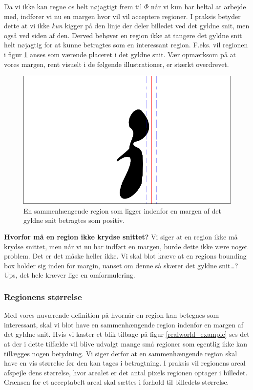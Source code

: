 {Da vi ikke kan regne os helt nøjagtigt frem til $\varPhi$ når vi
kun har heltal at arbejde med, indfører vi nu en margen hvor vil vil
acceptere regioner. I praksis betyder dette at vi ikke \emph{kun} kigger
på den linje der deler billedet ved det gyldne snit, men også ved siden
af den. Derved behøver en region ikke at tangere det gyldne snit helt
nøjagtig for at kunne betragtes som en interessant region. F.eks. vil
regionen i figur \ref{pos_naiv_margin_1} anses som værende placeret i
det gyldne snit. Vær opmærksom på at vores margen, rent visuelt i de
følgende illustrationer, er stærkt overdrevet.
\begin{figure}[h]
	\begin{center}
		\includegraphics[scale=\imgscale,angle=0]{afsnit/vores_implementation/billeder/naiv_algoritme/naiv_positiv_blob_margin_1}
	\end{center}
	\caption[Positiv region i margen]{En sammenhængende region som ligger indenfor en margen
	af det gyldne snit betragtes som positiv.}
	\label{pos_naiv_margin_1}
\end{figure}

\textbf{Hvorfor må en region ikke krydse snittet?} \hspace{0.4cm}Vi siger at en region
ikke må krydse snittet, men når vi nu har indført en margen, burde dette
ikke være noget problem. Det er det måske heller ikke. Vi skal blot
kræve at en regions bounding box holder sig inden for margin, uanset om
denne så skærer det gyldne snit\dots? Ups, det hele kræver lige en
omformulering.

\subsubsection{Regionens størrelse}
Med vores nuværende definition på hvornår en region kan betegnes som
interessant, skal vi blot have en sammenhængende region indenfor en
margen af det gyldne snit. Hvis vi kaster et blik tilbage på figur
\ref{realworld_example} ses det at der i dette tilfælde vil blive
udvalgt mange små regioner som egentlig ikke kan tillægges nogen
betydning. Vi siger derfor at en sammenhængende region skal have en vis
størrelse før den kan tages i betragtning. I praksis vil regionens areal
afspejle dens størrelse, hvor arealet er det antal pixels regionen
optager i billedet. Grænsen for et acceptabelt areal skal sættes i
forhold til billedets størrelse.

}
